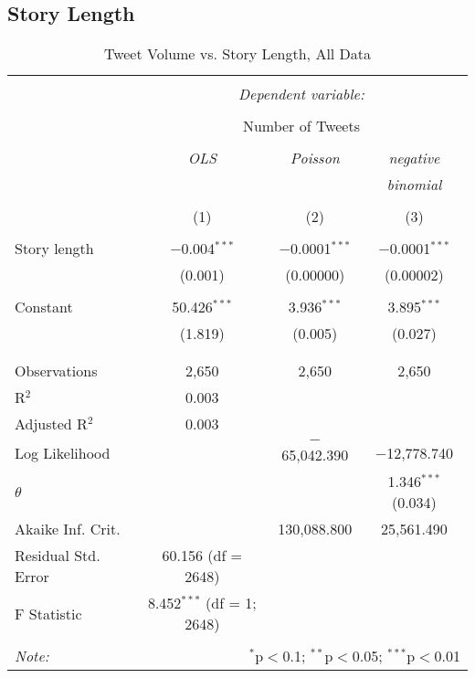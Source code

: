 \subsection{Story Length} 
\begin{table}[!htbp] \centering 
  \caption{Tweet Volume vs. Story Length, All Data} 
  \label{} 
    \begin{tabular}{@{\extracolsep{5pt}}lccc} 
    \\[-1.8ex]\hline 
    \hline \\[-1.8ex] 
     & \multicolumn{3}{c}{\textit{Dependent variable:}} \\ 
    \cline{2-4} 
    \\[-1.8ex] & \multicolumn{3}{c}{Number of Tweets} \\ 
    \\[-1.8ex] & \textit{OLS} & \textit{Poisson} & \textit{negative} \\ 
     & \textit{} & \textit{} & \textit{binomial} \\ 
    \\[-1.8ex] & (1) & (2) & (3)\\ 
    \hline \\[-1.8ex] 
     Story length & $-$0.004$^{***}$ & $-$0.0001$^{***}$ & $-$0.0001$^{***}$ \\ 
      & (0.001) & (0.00000) & (0.00002) \\ 
      & & & \\ 
     Constant & 50.426$^{***}$ & 3.936$^{***}$ & 3.895$^{***}$ \\ 
      & (1.819) & (0.005) & (0.027) \\ 
      & & & \\ 
    \hline \\[-1.8ex] 
    Observations & 2,650 & 2,650 & 2,650 \\ 
    R$^{2}$ & 0.003 &  &  \\ 
    Adjusted R$^{2}$ & 0.003 &  &  \\ 
    Log Likelihood &  & $-$65,042.390 & $-$12,778.740 \\ 
    $\theta$ &  &  & 1.346$^{***}$  (0.034) \\ 
    Akaike Inf. Crit. &  & 130,088.800 & 25,561.490 \\ 
    Residual Std. Error & 60.156 (df = 2648) &  &  \\ 
    F Statistic & 8.452$^{***}$ (df = 1; 2648) &  &  \\ 
    \hline 
    \hline \\[-1.8ex] 
    \textit{Note:}  & \multicolumn{3}{r}{$^{*}$p$<$0.1; $^{**}$p$<$0.05; $^{***}$p$<$0.01} \\ 
    \end{tabular} 
\end{table} 

